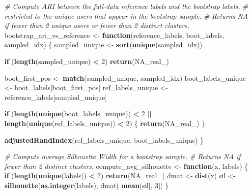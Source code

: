 \documentclass[
  11pt,
]{article}
\newenvironment{Shaded}{\begin{snugshade}}{\end{snugshade}}
\newcommand{\CommentTok}[1]{\textcolor[rgb]{0.56,0.35,0.01}{\textit{#1}}}
\newcommand{\ConstantTok}[1]{\textcolor[rgb]{0.56,0.35,0.01}{#1}}
\newcommand{\ControlFlowTok}[1]{\textcolor[rgb]{0.13,0.29,0.53}{\textbf{#1}}}
\newcommand{\DecValTok}[1]{\textcolor[rgb]{0.00,0.00,0.81}{#1}}
\newcommand{\FunctionTok}[1]{\textcolor[rgb]{0.13,0.29,0.53}{\textbf{#1}}}
\newcommand{\NormalTok}[1]{#1}
\newcommand{\OtherTok}[1]{\textcolor[rgb]{0.56,0.35,0.01}{#1}}
\newcommand{\SpecialCharTok}[1]{\textcolor[rgb]{0.81,0.36,0.00}{\textbf{#1}}}
\begin{document}
\begin{Shaded}
\begin{Highlighting}[]
\CommentTok{\# Compute ARI between the full{-}data reference labels and the bootstrap labels,}
\CommentTok{\# restricted to the unique users that appear in the bootstrap sample.}
\CommentTok{\# Returns NA if fewer than 2 unique users or fewer than 2 distinct clusters.}
\NormalTok{bootstrap\_ari\_vs\_reference }\OtherTok{\textless{}{-}} \ControlFlowTok{function}\NormalTok{(reference\_labels, boot\_labels, sampled\_idx) \{}
\NormalTok{  sampled\_unique }\OtherTok{\textless{}{-}} \FunctionTok{sort}\NormalTok{(}\FunctionTok{unique}\NormalTok{(sampled\_idx))}

  \ControlFlowTok{if}\NormalTok{ (}\FunctionTok{length}\NormalTok{(sampled\_unique) }\SpecialCharTok{\textless{}} \DecValTok{2}\NormalTok{) }\FunctionTok{return}\NormalTok{(}\ConstantTok{NA\_real\_}\NormalTok{)}

\NormalTok{  boot\_first\_pos     }\OtherTok{\textless{}{-}} \FunctionTok{match}\NormalTok{(sampled\_unique, sampled\_idx)}
\NormalTok{  boot\_labels\_unique }\OtherTok{\textless{}{-}}\NormalTok{ boot\_labels[boot\_first\_pos]}
\NormalTok{  ref\_labels\_unique  }\OtherTok{\textless{}{-}}\NormalTok{ reference\_labels[sampled\_unique]}

  \ControlFlowTok{if}\NormalTok{ (}\FunctionTok{length}\NormalTok{(}\FunctionTok{unique}\NormalTok{(boot\_labels\_unique)) }\SpecialCharTok{\textless{}} \DecValTok{2} \SpecialCharTok{||}
      \FunctionTok{length}\NormalTok{(}\FunctionTok{unique}\NormalTok{(ref\_labels\_unique))  }\SpecialCharTok{\textless{}} \DecValTok{2}\NormalTok{) \{}
    \FunctionTok{return}\NormalTok{(}\ConstantTok{NA\_real\_}\NormalTok{)}
\NormalTok{  \}}

  \FunctionTok{adjustedRandIndex}\NormalTok{(ref\_labels\_unique, boot\_labels\_unique)}
\NormalTok{\}}

\CommentTok{\# Compute average Silhouette Width for a bootstrap sample.}
\CommentTok{\# Returns NA if fewer than 2 distinct clusters.}
\NormalTok{compute\_avg\_silhouette }\OtherTok{\textless{}{-}} \ControlFlowTok{function}\NormalTok{(x, labels) \{}
  \ControlFlowTok{if}\NormalTok{ (}\FunctionTok{length}\NormalTok{(}\FunctionTok{unique}\NormalTok{(labels)) }\SpecialCharTok{\textless{}} \DecValTok{2}\NormalTok{) }\FunctionTok{return}\NormalTok{(}\ConstantTok{NA\_real\_}\NormalTok{)}
\NormalTok{  dmat }\OtherTok{\textless{}{-}} \FunctionTok{dist}\NormalTok{(x)}
\NormalTok{  sil  }\OtherTok{\textless{}{-}} \FunctionTok{silhouette}\NormalTok{(}\FunctionTok{as.integer}\NormalTok{(labels), dmat)}
  \FunctionTok{mean}\NormalTok{(sil[, }\DecValTok{3}\NormalTok{])}
\NormalTok{\}}


\end{Highlighting}
\end{Shaded}
\end{document}
